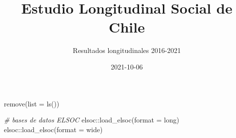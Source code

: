 \documentclass[
  12pt,
]{book}
\title{Estudio Longitudinal Social de Chile}
\subtitle{Resultados longitudinales 2016-2021}
\author{}
\date{\vspace{-2.5em}2021-10-06}
\newenvironment{Shaded}{\begin{snugshade}}{\end{snugshade}}
\newcommand{\AttributeTok}[1]{\textcolor[rgb]{0.77,0.63,0.00}{#1}}
\newcommand{\CommentTok}[1]{\textcolor[rgb]{0.56,0.35,0.01}{\textit{#1}}}
\newcommand{\FunctionTok}[1]{\textcolor[rgb]{0.00,0.00,0.00}{#1}}
\newcommand{\NormalTok}[1]{#1}
\newcommand{\SpecialCharTok}[1]{\textcolor[rgb]{0.00,0.00,0.00}{#1}}
\newcommand{\StringTok}[1]{\textcolor[rgb]{0.31,0.60,0.02}{#1}}
\begin{document}
\maketitle

{
\setcounter{tocdepth}{1}
\tableofcontents
}
\listoftables
\listoffigures
{}
\begin{Shaded}
\begin{Highlighting}[]
\FunctionTok{remove}\NormalTok{(}\AttributeTok{list =} \FunctionTok{ls}\NormalTok{())}

\CommentTok{\# bases de datos ELSOC}
\NormalTok{elsoc}\SpecialCharTok{::}\FunctionTok{load\_elsoc}\NormalTok{(}\AttributeTok{format =} \StringTok{\textquotesingle{}long\textquotesingle{}}\NormalTok{)}
\NormalTok{elsoc}\SpecialCharTok{::}\FunctionTok{load\_elsoc}\NormalTok{(}\AttributeTok{format =} \StringTok{\textquotesingle{}wide\textquotesingle{}}\NormalTok{)}
\end{Highlighting}
\end{Shaded}
\end{document}
